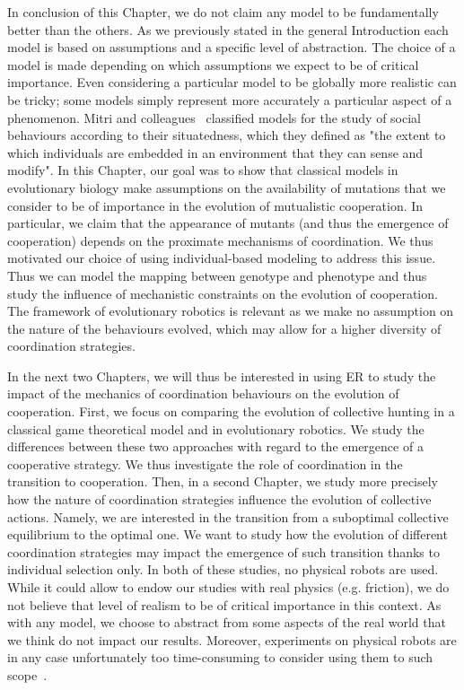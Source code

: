     In conclusion of this Chapter, we do not claim any model to be fundamentally better than the others. As we previously stated in the general Introduction each model is based on assumptions and a specific level of abstraction. The choice of a model is made depending on which assumptions we expect to be of critical importance. Even considering a particular model to be globally more realistic can be tricky; some models simply represent more accurately a particular aspect of a phenomenon. Mitri and colleagues~\parencite{Mitri2013} classified models for the study of social behaviours according to their situatedness, which they defined as "the extent to which individuals are embedded in an environment that they can sense and modify". In this Chapter, our goal was to show that classical models in evolutionary biology make assumptions on the availability of mutations that we consider to be of importance in the evolution of mutualistic cooperation. In particular, we claim that the appearance of mutants (and thus the emergence of cooperation) depends on the proximate mechanisms of coordination. We thus motivated our choice of using individual-based modeling to address this issue. Thus we can model the mapping between genotype and phenotype and thus study the influence of mechanistic constraints on the evolution of cooperation. The framework of evolutionary robotics is relevant as we make no assumption on the nature of the behaviours evolved, which may allow for a higher diversity of coordination strategies.

    In the next two Chapters, we will thus be interested in using ER to study the impact of the mechanics of coordination behaviours on the evolution of cooperation. First, we focus on comparing the evolution of collective hunting in a classical game theoretical model and in evolutionary robotics. We study the differences between these two approaches with regard to the emergence of a cooperative strategy. We thus investigate the role of coordination in the transition to cooperation. Then, in a second Chapter, we study more precisely how the nature of coordination strategies influence the evolution of collective actions. Namely, we are interested in the transition from a suboptimal collective equilibrium to the optimal one. We want to study how the evolution of different coordination strategies may impact the emergence of such transition thanks to individual selection only. In both of these studies, no physical robots are used. While it could allow to endow our studies with real physics (e.g. friction), we do not believe that level of realism to be of critical importance in this context. As with any model, we choose to abstract from some aspects of the real world that we think do not impact our results. Moreover, experiments on physical robots are in any case unfortunately too time-consuming to consider using them to such scope~\parencite{Mitri2013, Doncieux2015a}.

